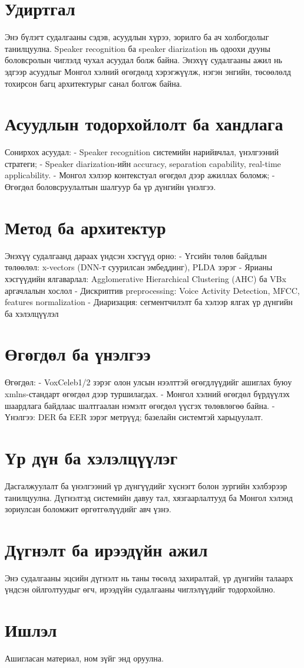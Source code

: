 
\section{Удиртгал}
Энэ бүлэгт судалгааны сэдэв, асуудлын хүрээ, зорилго ба ач холбогдолыг танилцуулна. Speaker recognition ба speaker diarization нь одоохи дууны боловсролын чиглэлд чухал асуудал болж байна. Энэхүү судалгааны ажил нь эдгээр асуудлыг Монгол хэлний өгөгдөлд хэрэгжүүлж, нэгэн энгийн, төсөөлөлд тохирсон багц архитектурыг санал болгож байна. 

\section{Асуудлын тодорхойлолт ба хандлага}
Сонирхох асуудал:
- Speaker recognition системийн нарийвчлал, үнэлгээний стратеги;
- Speaker diarization-ийн accuracy, separation capability, real-time applicability.
- Монгол хэлээр контекстуал өгөгдөл дээр ажиллах боломж;
- Өгөгдөл боловсруулалтын шалгуур ба үр дүнгийн үнэлгээ.

\section{Метод ба архитектур}
Энэхүү судалгаанд дараах үндсэн хэсгүүд орно:
- Үгсийн төлөв байдлын төлөөлөл: x-vectors (DNN-т суурилсан эмбеддинг), PLDA зэрэг
- Ярианы хэсгүүдийн ялгаварлал: Agglomerative Hierarchical Clustering (AHC) ба VBx аргачлалын хослол
- Дискриптив preprocessing: Voice Activity Detection, MFCC, features normalization
- Диаризация: сегментчилэлт ба хэлээр ялгах үр дүнгийн ба хэлэлцүүлэл

\section{Өгөгдөл ба үнэлгээ}
Өгөгдөл:
- VoxCeleb1/2 зэрэг олон улсын нээлттэй өгөгдлүүдийг ашиглах буюу xmlns-стандарт өгөгдөл дээр туршилагдах.
- Монгол хэлний өгөгдөл бүрдүүлэх шаардлага байдлаас шалтгаалан нэмэлт өгөгдөл үүсгэх төлөвлөгөө байна.
- Үнэлгээ: DER ба EER зэрэг метрүүд; базелайн системтэй харьцуулалт.

\section{Үр дүн ба хэлэлцүүлэг}
Дасгалжуулалт ба үнэлгээний үр дүнгүүдийг хүснэгт болон зургийн хэлбэрээр танилцуулна. Дүгнэлтэд системийн давуу тал, хязгаарлалтууд ба Монгол хэлэнд зориулсан боломжит өргөтгөлүүдийг авч үзнэ.

\section{Дүгнэлт ба ирээдүйн ажил}
Энэ судалгааны эцсийн дүгнэлт нь таны төсөлд захиралтай, үр дүнгийн талаарх үндсэн ойлголтуудыг өгч, ирээдүйн судалгааны чиглэлүүдийг тодорхойлно.

\section{Ишлэл}
Ашигласан материал, ном зүйг энд оруулна.
